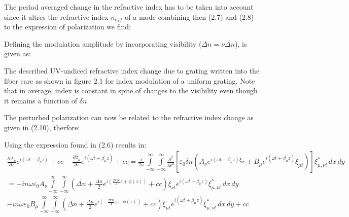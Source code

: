 \documentclass[11pt, openright]{book}
\begin{document}
        The period averaged change in the refractive index has to be taken into account since it altres the refractive index $n_{eff}$ of  a mode combining then (2.7) and (2.8) to the expression of polarization we find: 

        Defining the modulation amplitude by incorporating visibility ($\Delta n = \nu \overline{\Delta n}$), is given as: 

        The described UV-undiced refractive index change due to grating written into the fiber care as shown in figure 2.1 for index modulation of a uniform grating. Note that in average, index is constant in spite of changes to the visibility even though it remains a function of $\delta n$


        The perturbed polarization can now be related to the refractive index change as given in (2.10), therfore: 

        Using the expression found in (2.6) results in:\footnotesize{ 
         \begin{multline*}
           \frac{\partial A_\nu}{\partial z} e^{i(\omega t - \beta_\nu z)} + cc - \frac{\partial \beta_\mu}{\partial z} e^{i(\omega t + \beta_\mu z)} + cc 
            =  \frac{i}{2\omega} \int\limits_{-\infty}^{\infty} \int\limits_{-\infty}^{\infty} \frac{\partial^{2} }{\partial t^{2}} \left[ \varepsilon_0\delta n\left( A_\nu e^{i(\omega t-\beta_\nu z) \xi_{\nu t}} + B_\mu e^{i(\omega t + \beta _\mu z)}  \xi_{\mu t} \right) \right] \xi_{\mu,\nu t}^*  \,dx \,dy\\
           =-in\omega\varepsilon_0A_\nu \int\limits_{-\infty}^{\infty} \int\limits_{-\infty}^{\infty} \left(\overline{\Delta n} + \frac{\Delta n}{2}e^{i(\frac{2\pi N}{\Lambda}z+\phi(z))} +cc \right)\xi_{\nu t} e^{i(\omega t-\beta_{\nu}z)}\xi_{\mu, \nu t}^*  \,dx \,dy\\ 
           - in\omega\varepsilon_0B_{\mu} \int\limits_{-\infty}^{\infty} \int\limits_{-\infty}^{\infty} \left(\overline{\Delta n}+\frac{\Delta n}{2}e^{i(-\frac{2\pi n}{\Lambda}z -\phi(z))} +cc\right) \xi_{\mu t}e^{i(\omega t +\beta_\mu z)}\xi_{\mu,\nu t}^* \,dx  \,dy + cc  
        \end{multline*} }
\end{document}
